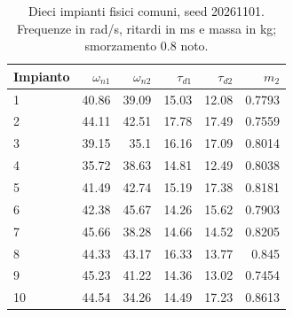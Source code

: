 \begin{table}[htbp]\centering\small
\setlength{\tabcolsep}{4pt}
\begin{tabular}{lrrrrr}\toprule
Impianto & $\omega_{n1}$ & $\omega_{n2}$ & $\tau_{d1}$ & $\tau_{d2}$ & $m_2$\\\midrule
1 & \num{40.86} & \num{39.09} & \num{15.03} & \num{12.08} & \num{0.7793}\\
2 & \num{44.11} & \num{42.51} & \num{17.78} & \num{17.49} & \num{0.7559}\\
3 & \num{39.15} & \num{35.1} & \num{16.16} & \num{17.09} & \num{0.8014}\\
4 & \num{35.72} & \num{38.63} & \num{14.81} & \num{12.49} & \num{0.8038}\\
5 & \num{41.49} & \num{42.74} & \num{15.19} & \num{17.38} & \num{0.8181}\\
6 & \num{42.38} & \num{45.67} & \num{14.26} & \num{15.62} & \num{0.7903}\\
7 & \num{45.66} & \num{38.28} & \num{14.66} & \num{14.52} & \num{0.8205}\\
8 & \num{44.33} & \num{43.17} & \num{16.33} & \num{13.77} & \num{0.845}\\
9 & \num{45.23} & \num{41.22} & \num{14.36} & \num{13.02} & \num{0.7454}\\
10 & \num{44.54} & \num{34.26} & \num{14.49} & \num{17.23} & \num{0.8613}\\
\bottomrule\end{tabular}
\caption{Dieci impianti fisici comuni, seed 20261101. Frequenze in rad/s, ritardi in ms e massa in kg; smorzamento 0.8 noto.}
\end{table}
